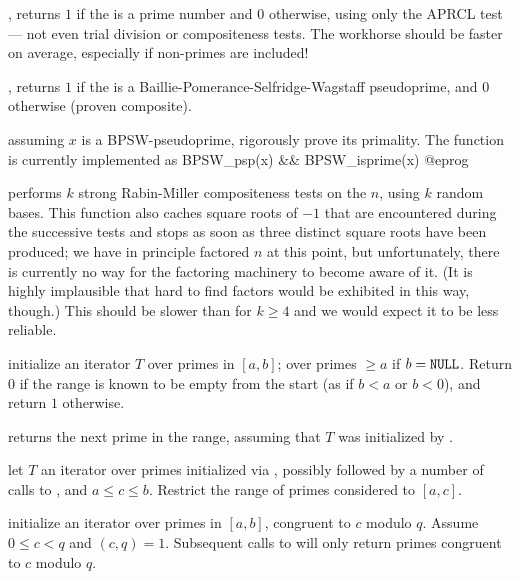 , returns $1$ if the   is a
prime number and $0$ otherwise, using only the APRCL test --- not even trial
division or compositeness tests. The workhorse  should be
faster on average, especially if non-primes are included!

, returns $1$ if the   is a
Baillie-Pomerance-Selfridge-Wagstaff pseudoprime, and $0$ otherwise (proven
composite).

 assuming $x$ is a BPSW-pseudoprime, rigorously
prove its primality. The function  is currently implemented
as
\bprog
 BPSW_psp(x) && BPSW_isprime(x)
@eprog

 performs $k$ strong Rabin-Miller
compositeness tests on the  $n$, using $k$ random bases. This
function also caches square roots of $-1$ that are encountered during the
successive tests and stops as soon as three distinct square roots have been
produced; we have in principle factored $n$ at this point, but
unfortunately, there is currently no way for the factoring machinery to
become aware of it. (It is highly implausible that hard to find factors
would be exhibited in this way, though.) This should be slower than
 for $k\geq 4$ and we would expect it to be less reliable.


 initialize an
iterator $T$ over primes in $[a,b]$; over primes $\geq a$ if $b =
{\tt NULL}$. Return $0$ if the range is known to be empty from the start
(as if $b < a$ or $b < 0$), and return $1$ otherwise.

 returns the next prime in the range,
assuming that $T$ was initialized by .



 let $T$ an iterator
over primes initialized via , possibly
followed by a number of calls to , and $a \leq c \leq
b$. Restrict the range of primes considered to $[a,c]$.

 initialize an iterator over primes in $[a,b]$, congruent to $c$
modulo $q$. Assume $0 \leq c < q$ and $(c,q) = 1$. Subsequent calls to
 will only return primes congruent to $c$ modulo $q$.

